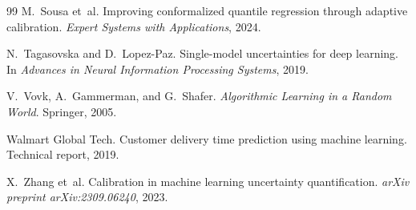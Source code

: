 \documentclass[12pt]{article}
\begin{document}
\begin{thebibliography}{99}
M.~Sousa et~al.
\newblock Improving conformalized quantile regression through adaptive calibration.
\newblock \emph{Expert Systems with Applications}, 2024.

N.~Tagasovska and D.~Lopez-Paz.
\newblock Single-model uncertainties for deep learning.
\newblock In \emph{Advances in Neural Information Processing Systems}, 2019.

V.~Vovk, A.~Gammerman, and G.~Shafer.
\newblock \emph{Algorithmic Learning in a Random World}.
\newblock Springer, 2005.

Walmart Global Tech.
\newblock Customer delivery time prediction using machine learning.
\newblock Technical report, 2019.

X.~Zhang et~al.
\newblock Calibration in machine learning uncertainty quantification.
\newblock \emph{arXiv preprint arXiv:2309.06240}, 2023.

\end{thebibliography}
\end{document}
